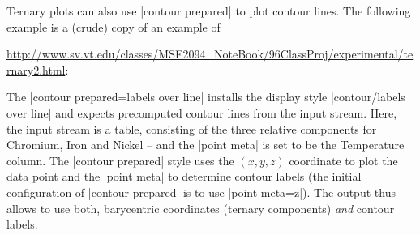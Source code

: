 Ternary plots can also use |contour prepared| to plot contour lines. 
The following example is a (crude) copy of an example of 

\url{http://www.sv.vt.edu/classes/MSE2094_NoteBook/96ClassProj/experimental/ternary2.html}:

\begin{codeexample}[]
\end{codeexample}
\noindent The |contour prepared={labels over line}| installs the display style |contour/labels over line| and expects precomputed contour lines from the input stream. Here, the input stream is a table, consisting of the three relative components for Chromium, Iron and Nickel -- and the |point meta| is set to be the Temperature column. The |contour prepared| style uses the $(x,y,z)$ coordinate to plot the data point and the |point meta| to determine contour labels (the initial configuration of |contour prepared| is to use |point meta=z|). The output thus allows to use both, barycentric coordinates (ternary components) \emph{and} contour labels.

